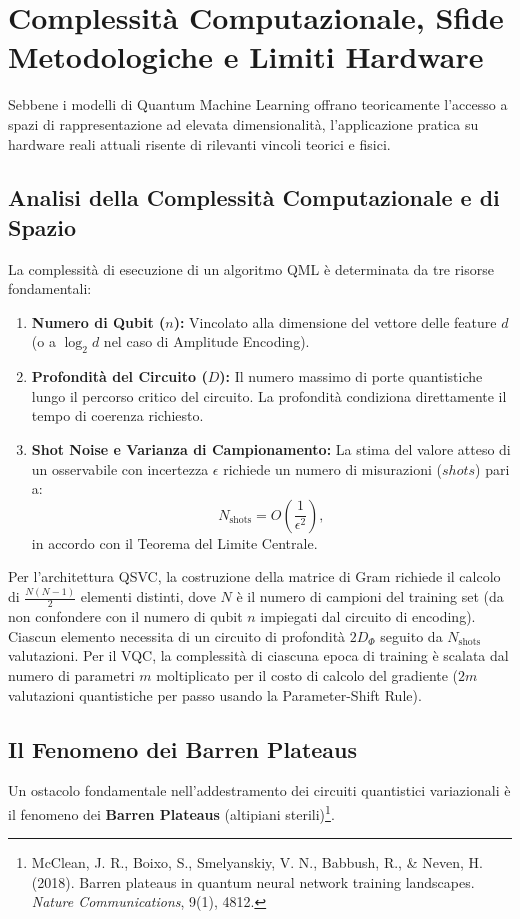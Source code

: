 \section{Complessità Computazionale, Sfide Metodologiche e Limiti Hardware}
\label{sec:sfide_e_limiti}

Sebbene i modelli di Quantum Machine Learning offrano teoricamente l'accesso a spazi di rappresentazione ad elevata dimensionalità, l'applicazione pratica su hardware reali attuali risente di rilevanti vincoli teorici e fisici.

\subsection{Analisi della Complessità Computazionale e di Spazio}
La complessità di esecuzione di un algoritmo QML è determinata da tre risorse fondamentali:
\begin{enumerate}
    \item \textbf{Numero di Qubit ($n$):} Vincolato alla dimensione del vettore delle feature $d$ (o a $\log_2 d$ nel caso di Amplitude Encoding).
    \item \textbf{Profondità del Circuito ($D$):} Il numero massimo di porte quantistiche lungo il percorso critico del circuito. La profondità condiziona direttamente il tempo di coerenza richiesto.
    \item \textbf{Shot Noise e Varianza di Campionamento:} La stima del valore atteso di un osservabile con incertezza $\epsilon$ richiede un numero di misurazioni ($shots$) pari a:
    \begin{equation}
    N_{\text{shots}} = O\left(\frac{1}{\epsilon^2}\right),
    \end{equation}
    in accordo con il Teorema del Limite Centrale.
\end{enumerate}

Per l'architettura QSVC, la costruzione della matrice di Gram richiede il calcolo di $\frac{N(N-1)}{2}$ elementi distinti, dove $N$ è il numero di campioni del training set (da non confondere con il numero di qubit $n$ impiegati dal circuito di encoding). Ciascun elemento necessita di un circuito di profondità $2 D_{\Phi}$ seguito da $N_{\text{shots}}$ valutazioni. Per il VQC, la complessità di ciascuna epoca di training è scalata dal numero di parametri $m$ moltiplicato per il costo di calcolo del gradiente ($2m$ valutazioni quantistiche per passo usando la Parameter-Shift Rule).

\subsection{Il Fenomeno dei Barren Plateaus}
Un ostacolo fondamentale nell'addestramento dei circuiti quantistici variazionali è il fenomeno dei \textbf{Barren Plateaus} (altipiani sterili)\footnote{McClean, J. R., Boixo, S., Smelyanskiy, V. N., Babbush, R., \& Neven, H. (2018). Barren plateaus in quantum neural network training landscapes. \textit{Nature Communications}, 9(1), 4812.}.

